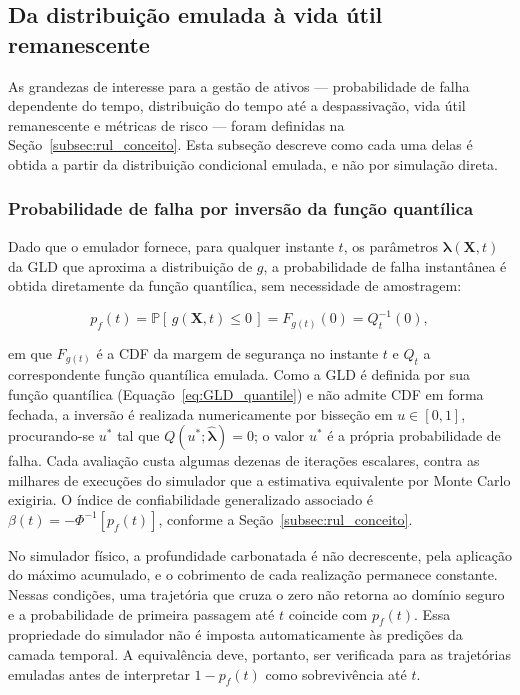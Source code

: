 \subsection{Da distribui\c{c}\~ao emulada \`a vida \'util remanescente}
\label{subsec:rul}

As grandezas de interesse para a gestão de ativos --- probabilidade de falha dependente do tempo, distribuição do tempo até a despassivação, vida útil remanescente e métricas de risco --- foram definidas na Seção~\ref{subsec:rul_conceito}. Esta subseção descreve como cada uma delas é obtida a partir da distribuição condicional emulada, e não por simulação direta.

\subsubsection{Probabilidade de falha por invers\~ao da fun\c{c}\~ao quant\'ilica}
\label{subsec:pf}

Dado que o emulador fornece, para qualquer instante $t$, os parâmetros $\hat{\boldsymbol{\lambda}}(\mathbf{X},t)$ da GLD que aproxima a distribuição de $g$, a probabilidade de falha instantânea é obtida diretamente da função quantílica, sem necessidade de amostragem:

\begin{equation}
p_f(t) = \mathbb{P}\left[\, g(\mathbf{X}, t) \leq 0 \,\right] = F_{g(t)}(0) = Q^{-1}_{t}(0),
\label{eq:pf_t}
\end{equation}

\noindent em que $F_{g(t)}$ é a CDF da margem de segurança no instante $t$ e $Q_t$ a correspondente função quantílica emulada. Como a GLD é definida por sua função quantílica (Equação~\eqref{eq:GLD_quantile}) e não admite CDF em forma fechada, a inversão é realizada numericamente por bisseção em $u \in [0,1]$, procurando-se $u^{*}$ tal que $Q(u^{*};\hat{\boldsymbol{\lambda}}) = 0$; o valor $u^{*}$ é a própria probabilidade de falha. Cada avaliação custa algumas dezenas de iterações escalares, contra as milhares de execuções do simulador que a estimativa equivalente por Monte Carlo exigiria. O índice de confiabilidade generalizado associado é $\beta(t) = -\Phi^{-1}\!\left[p_f(t)\right]$, conforme a Seção~\ref{subsec:rul_conceito}.

No simulador físico, a profundidade carbonatada é não decrescente, pela aplicação do máximo acumulado, e o cobrimento de cada realização permanece constante. Nessas condições, uma trajetória que cruza o zero não retorna ao domínio seguro e a probabilidade de primeira passagem até $t$ coincide com $p_f(t)$. Essa propriedade do simulador não é imposta automaticamente às predições da camada temporal. A equivalência deve, portanto, ser verificada para as trajetórias emuladas antes de interpretar $1-p_f(t)$ como sobrevivência até $t$.
